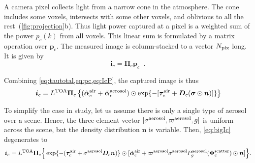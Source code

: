 \documentclass[10pt,letterpaper]{article}
\newcommand{\vect}[1]{\bm{#1}}
\newcommand{\yoavcomment}[1]{}
\renewcommand{\yoavcomment}[1]{#1} %
\begin{document}
A camera pixel collects light from a narrow cone in the
atmosphere. The cone includes some voxels, intersects with some other
voxels, and oblivious to all the rest~(\cref{fig:projection}b).
Thus light power captured at a pixel is a weighted sum of the power
$p_c(k)$ from all voxels.  This linear sum is formulated by a matrix
operation over ${\bm p}_c$. The measured image is column-stacked to a
vector $N_{\rm pix}$ long. It is given by
\begin{equation}
  {\bm i}_c= {\vect{\Pi}}_c{\bm p}_c
  \;\;.
  \label{eq:IcP}
\end{equation}

Combining \cref{eq:tautotal,eq:pc,eq:IcP}, the captured image is thus
\begin{align}
  {\bm i}_c= L^{\rm TOA} {\vect{\Pi}}_c \left\{
    (\tilde{\vect{\alpha}}^{\rm air}_c + \tilde{\vect{\alpha}}^{\rm
      aerosol}_c) \odot \exp\{-[\vect{\tau}_c^{\rm air} + {\bm D}_c
      (\vect{\sigma} \odot {\bm n})]\} \right\}
  \label{eq:bigIc}
\end{align}

To simplify the case in study, let us assume there is only a single
type of aerosol over a scene. Hence, the three-element vector
$[{\sigma}^{\rm aerosol},\varpi^{\rm aerosol},g]$ is uniform across
the scene, but the density distribution ${\bm n}$ is variable. Then,
\cref{eq:bigIc} degenerates to
\begin{align}
  {\bm i}_c= L^{\rm TOA} {\vect{\Pi}}_c \Big\{ \exp\{-(\vect{\tau}_c^{\rm
      air} + {\sigma}^{\rm aerosol} {\bm D}_c {\bm n})\}\odot
  [\tilde{\vect{\alpha}}^{\rm air}_c + \varpi^{\rm aerosol}\sigma^{\rm
    aerosol} P^{\rm aerosol}_g(\vect{\Phi}^{\rm scatter}_c) \odot{\bm
    n} ] \Big\} .
  \label{eq:bigIA}
\end{align}

\end{document}
